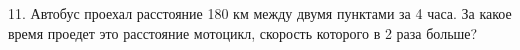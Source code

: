 11. Автобус проехал расстояние 180 км между двумя пунктами за 4 часа. За какое время проедет это расстояние мотоцикл, скорость которого в 2 раза больше?\\
